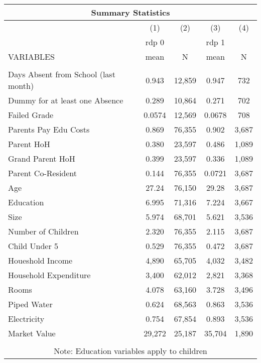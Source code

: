 \begin{tabular}{lcccc}
\multicolumn{5}{c}{Summary Statistics} \\ \hline
 & (1) & (2) & (3) & (4) \\
 & rdp 0 &  & rdp 1 &  \\
VARIABLES & mean & N & mean & N \\ \hline
 &  &  &  &  \\
Days Absent from School (last month) & 0.943 & 12,859 & 0.947 & 732 \\
Dummy for at least one Absence & 0.289 & 10,864 & 0.271 & 702 \\
Failed Grade & 0.0574 & 12,569 & 0.0678 & 708 \\
Parents Pay Edu Costs & 0.869 & 76,355 & 0.902 & 3,687 \\
Parent HoH & 0.380 & 23,597 & 0.486 & 1,089 \\
Grand Parent HoH & 0.399 & 23,597 & 0.336 & 1,089 \\
Parent Co-Resident & 0.144 & 76,355 & 0.0721 & 3,687 \\
Age & 27.24 & 76,150 & 29.28 & 3,687 \\
Education & 6.995 & 71,316 & 7.224 & 3,667 \\
Size & 5.974 & 68,701 & 5.621 & 3,536 \\
Number of Children & 2.320 & 76,355 & 2.115 & 3,687 \\
Child Under 5 & 0.529 & 76,355 & 0.472 & 3,687 \\
Houeshold Income & 4,890 & 65,705 & 4,032 & 3,482 \\
Household Expenditure & 3,400 & 62,012 & 2,821 & 3,368 \\
Rooms & 4.078 & 63,160 & 3.728 & 3,496 \\
Piped Water & 0.624 & 68,563 & 0.863 & 3,536 \\
Electricity & 0.754 & 67,854 & 0.893 & 3,536 \\
Market Value & 29,272 & 25,187 & 35,704 & 1,890 \\
 &  &  &  &  \\ \hline
\multicolumn{5}{c}{ Note: Education variables apply to children} \\
\end{tabular}
